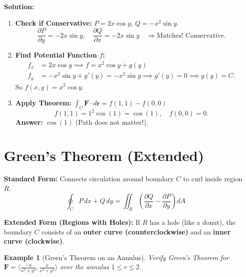 \documentclass[11pt]{article}
\newtheorem{example}{Example}[section]
\newcommand{\F}{\mathbf{F}}
\begin{document}
\textbf{Solution:}
\begin{enumerate}
    \item \textbf{Check if Conservative:} $P = 2x \cos y$, $Q = -x^2 \sin y$.
    \[
    \frac{\partial P}{\partial y} = -2x \sin y, \quad \frac{\partial Q}{\partial x} = -2x \sin y \quad \Rightarrow \text{Matches! Conservative.}
    \]
    \item \textbf{Find Potential Function $f$:}
    \begin{align*}
        f_x &= 2x \cos y \implies f = x^2 \cos y + g(y) \\
        f_y &= -x^2 \sin y + g'(y) = -x^2 \sin y \implies g'(y) = 0 \implies g(y) = C.
    \end{align*}
    So $f(x,y) = x^2 \cos y$.
    \item \textbf{Apply Theorem:} $\int_C \F \cdot d\mathbf{r} = f(1,1) - f(0,0)$
    \[
    f(1,1) = 1^2 \cos(1) = \cos(1), \quad f(0,0) = 0.
    \]
    \textbf{Answer:} $\cos(1)$ (Path does not matter!).
\end{enumerate}

\section{Green's Theorem (Extended)}

\textbf{Standard Form:} Connects circulation around boundary $C$ to curl inside region $R$.
\[
\oint_C P\,dx + Q\,dy = \iint_R \left( \frac{\partial Q}{\partial x} - \frac{\partial P}{\partial y} \right) dA
\]

\textbf{Extended Form (Regions with Holes):} If $R$ has a hole (like a donut), the boundary $C$ consists of an \textbf{outer curve (counterclockwise)} and an \textbf{inner curve (clockwise)}.

\begin{example}[Green's Theorem on an Annulus]
Verify Green's Theorem for $\F = \langle \frac{-y}{x^2+y^2}, \frac{x}{x^2+y^2} \rangle$ over the annulus $1 \le r \le 2$.
\end{example}
\end{document}
